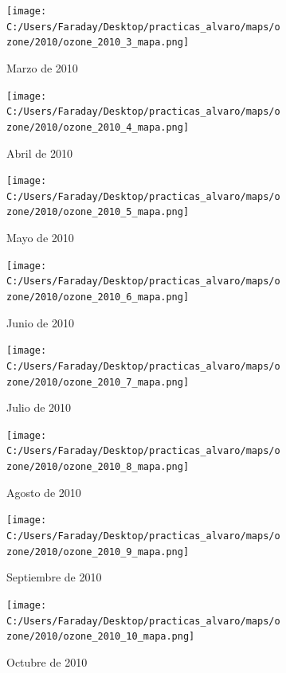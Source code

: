 \documentclass[12pt]{article}
\begin{document}
\begin{figure}[H]
\centering
\begin{subfigure}[h]{0.45\textwidth}
\texttt{[image: C:/Users/Faraday/Desktop/practicas\_alvaro/maps/ozone/2010/ozone\_2010\_3\_mapa.png]}
\caption{Marzo de 2010}
\label{fig:map-mon-2-3-2010}
\end{subfigure}
%
\begin{subfigure}[H]{0.45\textwidth}
\texttt{[image: C:/Users/Faraday/Desktop/practicas\_alvaro/maps/ozone/2010/ozone\_2010\_4\_mapa.png]}
\caption{Abril de 2010}
\label{fig:map-mon-2-4-2010}
\end{subfigure}
\caption{}
\end{figure}

\begin{figure}[H]
\centering
\begin{subfigure}[h]{0.45\textwidth}
\texttt{[image: C:/Users/Faraday/Desktop/practicas\_alvaro/maps/ozone/2010/ozone\_2010\_5\_mapa.png]}
\caption{Mayo de 2010}
\label{fig:map-mon-2-5-2010}
\end{subfigure}
%
\begin{subfigure}[H]{0.45\textwidth}
\texttt{[image: C:/Users/Faraday/Desktop/practicas\_alvaro/maps/ozone/2010/ozone\_2010\_6\_mapa.png]}
\caption{Junio de 2010}
\label{fig:map-mon-2-6-2010}
\end{subfigure}
\caption{}
\end{figure}

\newpage

\begin{figure}[H]
\centering
\begin{subfigure}[h]{0.45\textwidth}
\texttt{[image: C:/Users/Faraday/Desktop/practicas\_alvaro/maps/ozone/2010/ozone\_2010\_7\_mapa.png]}
\caption{Julio de 2010}
\label{fig:map-mon-2-7-2010}
\end{subfigure}
%
\begin{subfigure}[H]{0.45\textwidth}
\texttt{[image: C:/Users/Faraday/Desktop/practicas\_alvaro/maps/ozone/2010/ozone\_2010\_8\_mapa.png]}
\caption{Agosto de 2010}
\label{fig:map-mon-2-8-2010}
\end{subfigure}
\caption{}
\end{figure}

\begin{figure}[H]
\centering
\begin{subfigure}[h]{0.45\textwidth}
\texttt{[image: C:/Users/Faraday/Desktop/practicas\_alvaro/maps/ozone/2010/ozone\_2010\_9\_mapa.png]}
\caption{Septiembre de 2010}
\label{fig:map-mon-2-9-2010}
\end{subfigure}
%
\begin{subfigure}[H]{0.45\textwidth}
\texttt{[image: C:/Users/Faraday/Desktop/practicas\_alvaro/maps/ozone/2010/ozone\_2010\_10\_mapa.png]}
\caption{Octubre de 2010}
\label{fig:map-mon-2-10-2010}
\end{subfigure}
\caption{}
\end{figure}
\end{document}
